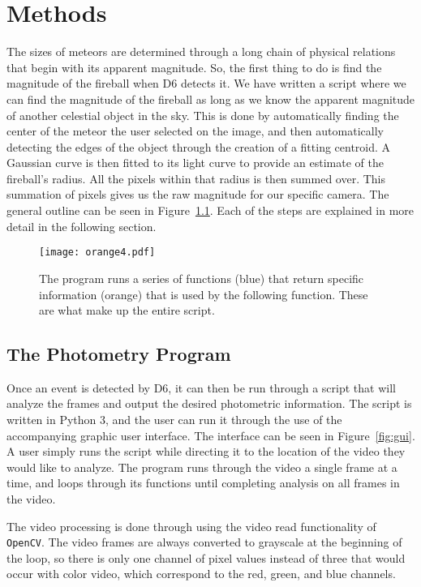 \chapter{Methods}

The sizes of meteors are determined through a long chain of physical relations that begin with its apparent magnitude. So, the first thing to do is find the magnitude of the fireball when D6 detects it. We have written a script where we can find the magnitude of the fireball as long as we know the apparent magnitude of another celestial object in the sky. This is done by automatically finding the center of the meteor the user selected on the image, and then automatically detecting the edges of the  object through the creation of a fitting centroid. A Gaussian curve is then fitted to its light curve to provide an estimate of the fireball's radius. All the pixels within that radius is then summed over. This summation of pixels gives us the raw magnitude for our specific camera. The general outline can be seen in Figure~\ref{fig:flowchart}. Each of the steps are explained in more detail in the following section.

\begin{figure}[htpb]
	\centering
	\texttt{[image: orange4.pdf]}
	\caption{The program runs a series of functions (blue) that return specific information (orange) that is used by the following function. These are what make up the entire script.}
	\label{fig:flowchart}
\end{figure}

\section{The Photometry Program}

Once an event is detected by D6, it can then be run through a script that will analyze the frames and output the desired photometric information. The script is written in Python 3, and the user can run it through the use of the accompanying graphic user interface. The interface can be seen in Figure~\ref{fig:gui}. A user simply runs the script while directing it to the location of the video they would like to analyze. The program runs through the video a single frame at a time, and loops through its functions until completing analysis on all frames in the video.

The video processing is done through using the video read functionality of \texttt{OpenCV}. The video frames are always converted to grayscale at the beginning of the loop, so there is only one channel of pixel values instead of three that would occur with color video, which correspond to the red, green, and blue channels.

